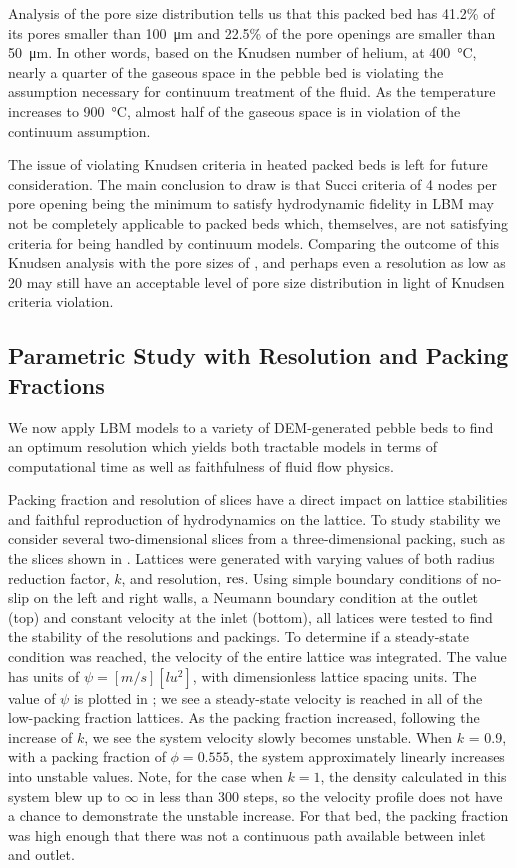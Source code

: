 Analysis of the pore size distribution tells us that this packed bed has 41.2\% of its pores smaller than \SI{100}{\micro\meter} and 22.5\% of the pore openings are smaller than \SI{50}{\micro\meter}. In other words, based on the Knudsen number of helium, at \SI{400}{\celsius}, nearly a quarter of the gaseous space in the pebble bed is violating the assumption necessary for continuum treatment of the fluid. As the temperature increases to \SI{900}{\celsius}, almost half of the gaseous space is in violation of the continuum assumption. 

The issue of violating Knudsen criteria in heated packed beds is left for future consideration. The main conclusion to draw is that Succi criteria of 4 nodes per pore opening being the minimum to satisfy hydrodynamic fidelity in LBM may not be completely applicable to packed beds which, themselves, are not satisfying criteria for being handled by continuum models. Comparing the outcome of this Knudsen analysis with the pore sizes of , and perhaps even a resolution as low as 20 may still have an acceptable level of pore size distribution in light of Knudsen criteria violation.



\subsection{Parametric Study with Resolution and Packing Fractions}
We now apply LBM models to a variety of DEM-generated pebble beds to find an optimum resolution which yields both tractable models in terms of computational time as well as faithfulness of fluid flow physics.

Packing fraction and resolution of slices have a direct impact on lattice stabilities and faithful reproduction of hydrodynamics on the lattice. To study stability we consider several two-dimensional slices from a three-dimensional packing, such as the slices shown in . Lattices were generated with varying values of both radius reduction factor, $k$, and resolution, $\text{res}$. Using simple boundary conditions of no-slip on the left and right walls, a Neumann boundary condition at the outlet (top) and constant velocity at the inlet (bottom), all latices were tested to find the stability of the resolutions and packings. To determine if a steady-state condition was reached, the velocity of the entire lattice was integrated. The value has units of $\psi = [m/s][lu^2]$, with dimensionless lattice spacing units. The value of $\psi$ is plotted in ; we see a steady-state velocity is reached in all of the low-packing fraction lattices. As the packing fraction increased, following the increase of $k$, we see the system velocity slowly becomes unstable. When $k$ = 0.9, with a packing fraction of $\phi = 0.555$, the system approximately linearly increases into unstable values. Note, for the case when $k=1$, the density calculated in this system blew up to $\infty$ in less than 300 steps, so the velocity profile does not have a chance to demonstrate the unstable increase. For that bed, the packing fraction was high enough that there was not a continuous path available between inlet and outlet.

